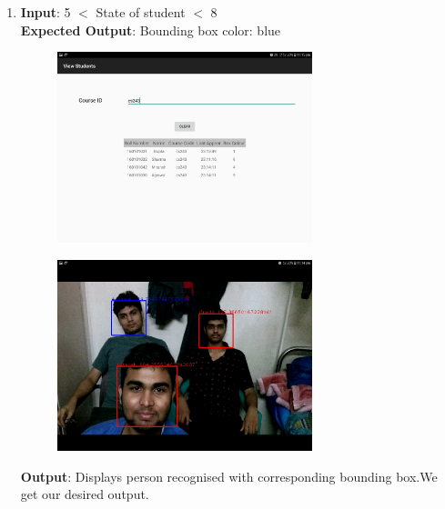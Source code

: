 \documentclass{scrreprt}
\begin{document}
\begin{itemize}
\begin{enumerate}
\item \textbf{Input}: 5 $<$ State of student $<$ 8\\
\textbf{Expected Output}: Bounding box color: blue
\begin{figure}[H]
\centering
\includegraphics[width=0.7\textwidth, keepaspectratio]{camstate.jpg}
\end{figure}
\begin{figure}[H]
\centering
\includegraphics[width=0.7\textwidth, keepaspectratio]{cam3stud.jpg}
\end{figure}
\textbf{Output}: Displays person recognised with corresponding bounding box.We get our desired output.


\end{enumerate}
\end{itemize}
\end{document}
